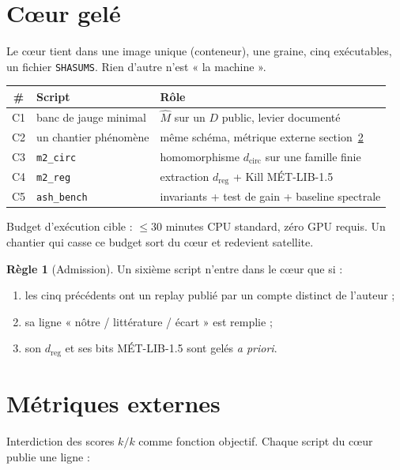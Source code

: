 \documentclass[11pt,a4paper]{article}
\newcommand{\Mhat}{\hat{M}}
\theoremstyle{definition}
\newtheorem{regle}{Règle}
\begin{document}
\section{Cœur gelé}
\label{sec:coeur}

Le cœur tient dans une image unique (conteneur), une graine, cinq exécutables, un fichier \texttt{SHASUMS}. Rien d'autre n'est « la machine ».

\begin{center}
\renewcommand{\arraystretch}{1.12}
\begin{tabular}{@{}clp{85mm}@{}}
\toprule
\textbf{\#} & \textbf{Script} & \textbf{Rôle} \\
\midrule
C1 & banc de jauge minimal & \(\Mhat\) sur un \(D\) public, levier documenté \\
C2 & un chantier phénomène & même schéma, métrique externe section~\ref{sec:metriques} \\
C3 & \texttt{m2\_circ} & homomorphisme \(d_{\mathrm{circ}}\) sur une famille finie \\
C4 & \texttt{m2\_reg} & extraction \(d_{\mathrm{reg}}\) + \(\mathrm{Kill}\) MÉT-LIB-1.5 \\
C5 & \texttt{ash\_bench} & invariants + test de gain + baseline spectrale \\
\bottomrule
\end{tabular}
\end{center}

Budget d'exécution cible : \(\le 30\) minutes CPU standard, zéro GPU requis. Un chantier qui casse ce budget sort du cœur et redevient satellite.

\begin{regle}[Admission]
Un sixième script n'entre dans le cœur que si :
\begin{enumerate}
  \item les cinq précédents ont un replay publié par un compte distinct de l'auteur ;
  \item sa ligne « nôtre / littérature / écart » est remplie ;
  \item son \(d_{\mathrm{reg}}\) et ses bits MÉT-LIB-1.5 sont gelés \emph{a priori}.
\end{enumerate}
\end{regle}

\section{Métriques externes}
\label{sec:metriques}

Interdiction des scores \(k/k\) comme fonction objectif. Chaque script du cœur publie une ligne :
\end{document}
